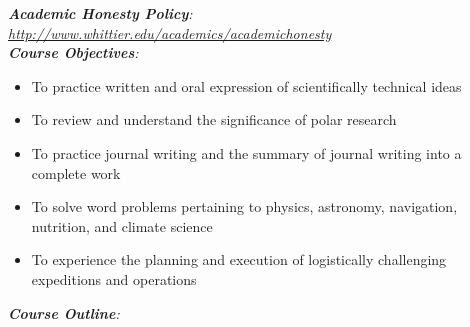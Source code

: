 \documentclass[10pt]{article}
\begin{document}
\textit{\textbf{Academic Honesty Policy}: \url{http://www.whittier.edu/academics/academichonesty}} \\
\clearpage
\textit{\textbf{Course Objectives}:}
\begin{itemize}
\item To practice written and oral expression of scientifically technical ideas
\item To review and understand the significance of polar research
\item To practice journal writing and the summary of journal writing into a complete work
\item To solve word problems pertaining to physics, astronomy, navigation, nutrition, and climate science
\item To experience the planning and execution of logistically challenging expeditions and operations
\end{itemize}
\textit{\textbf{Course Outline}:}
\end{document}
